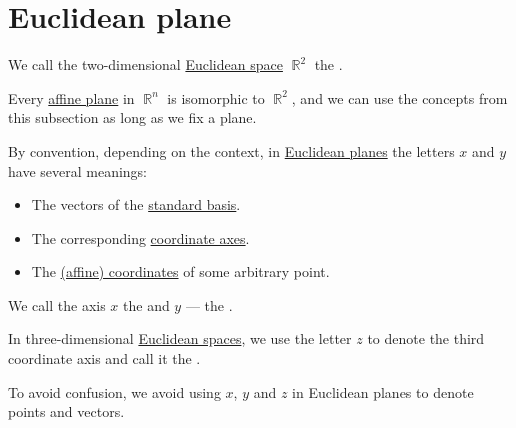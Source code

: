 \section{Euclidean plane}\label{sec:euclidean_plane}

\begin{definition}\label{def:euclidean_plane}
  We call the two-dimensional \hyperref[def:euclidean_space]{Euclidean space} \( \BbbR^2 \) the .
\end{definition}

\begin{remark}\label{rem:euclidean_plane_embedding}
  Every \hyperref[def:affine_plane]{affine plane} in \( \BbbR^n \) is isomorphic to \( \BbbR^2 \), and we can use the concepts from this subsection as long as we fix a plane.
\end{remark}

\begin{remark}\label{rem:xyz}
  By convention, depending on the context, in \hyperref[def:euclidean_plane]{Euclidean planes} the letters \( x \) and \( y \) have several meanings:
  \begin{itemize}
    \item The vectors of the \hyperref[def:sequence_space]{standard basis}.
    \item The corresponding \hyperref[def:euclidean_plane]{coordinate axes}.
    \item The \hyperref[def:affine_coordinate_system]{(affine) coordinates} of some arbitrary point.
  \end{itemize}

  We call the axis \( x \) the  and \( y \) --- the .

  In three-dimensional \hyperref[def:euclidean_space]{Euclidean spaces}, we use the letter \( z \) to denote the third coordinate axis and call it the .

  To avoid confusion, we avoid using \( x \), \( y \) and \( z \) in Euclidean planes to denote points and vectors.
\end{remark}

